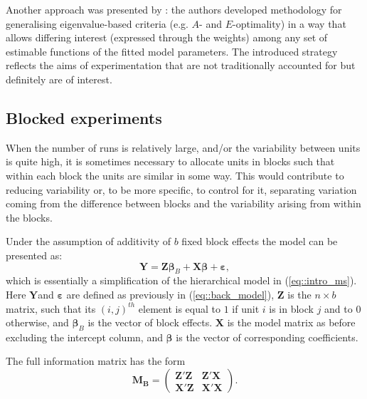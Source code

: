 Another approach was presented by \cite{Stallings2015general}: the authors developed methodology for generalising eigenvalue-based criteria (e.g. $A$- and $E$-optimality) in a way that allows differing interest (expressed through the weights) among any set of estimable functions of the fitted model parameters. The introduced strategy reflects the aims of experimentation that are not traditionally accounted for but definitely are of interest.

\subsection{Blocked experiments}
\label{sec::back_blocked}
When the number of runs is relatively large, and/or the variability between units is quite high, it is sometimes necessary to allocate units in blocks such that within each block the units are similar in some way. This would contribute to reducing variability or, to be more specific, to control for it, separating variation coming from the difference between blocks and the variability arising from within the blocks. 

Under the assumption of additivity of $b$ fixed block effects the model can be presented as:
\begin{equation}
\label{eq::blocked_model}
\bm{Y}=\bm{Z\beta}_B+\bm{X\beta}+\bm{\varepsilon},
\end{equation}
which is essentially a simplification of the hierarchical model in (\ref{eq::intro_ms}). Here $\bm{Y}$and $\bm{\varepsilon}$ are defined as previously in (\ref{eq::back_model}), $\bm{Z}$ is the $n\times b$ matrix, such that its $(i,j)^{th}$ element is equal to $1$ if unit $i$ is in block $j$ and to $0$ otherwise, and $\bm{\beta}_B$ is the vector of block effects. $\bm{X}$ is the model matrix as before excluding the intercept column, and $\bm{\beta}$ is the vector of corresponding coefficients. 

The full information matrix has the form
\begin{equation*}
\bm{M_B}=
\begin{pmatrix}
\bm{Z}'\bm{Z} & \bm{Z}'\bm{X}\\
\bm{X}'\bm{Z} & \bm{X}'\bm{X}
\end{pmatrix}.     
\end{equation*} 


